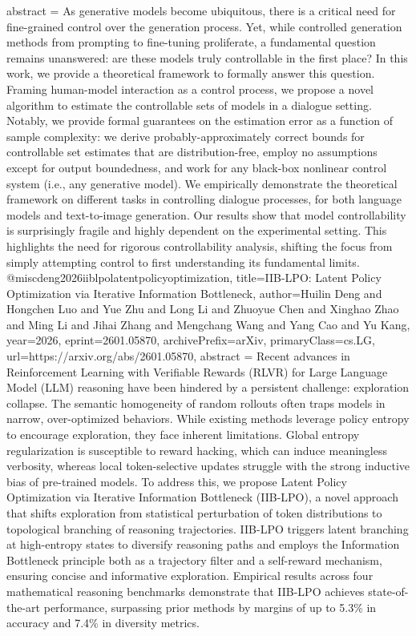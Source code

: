 {      abstract = {As generative models become ubiquitous, there is a critical need for fine-grained control over the generation process. Yet, while controlled generation methods from prompting to fine-tuning proliferate, a fundamental question remains unanswered: are these models truly controllable in the first place? In this work, we provide a theoretical framework to formally answer this question. Framing human-model interaction as a control process, we propose a novel algorithm to estimate the controllable sets of models in a dialogue setting. Notably, we provide formal guarantees on the estimation error as a function of sample complexity: we derive probably-approximately correct bounds for controllable set estimates that are distribution-free, employ no assumptions except for output boundedness, and work for any black-box nonlinear control system (i.e., any generative model). We empirically demonstrate the theoretical framework on different tasks in controlling dialogue processes, for both language models and text-to-image generation. Our results show that model controllability is surprisingly fragile and highly dependent on the experimental setting. This highlights the need for rigorous controllability analysis, shifting the focus from simply attempting control to first understanding its fundamental limits.}
}@misc{deng2026iiblpolatentpolicyoptimization,
      title={IIB-LPO: Latent Policy Optimization via Iterative Information Bottleneck}, 
      author={Huilin Deng and Hongchen Luo and Yue Zhu and Long Li and Zhuoyue Chen and Xinghao Zhao and Ming Li and Jihai Zhang and Mengchang Wang and Yang Cao and Yu Kang},
      year={2026},
      eprint={2601.05870},
      archivePrefix={arXiv},
      primaryClass={cs.LG},
      url={https://arxiv.org/abs/2601.05870},
      abstract = {Recent advances in Reinforcement Learning with Verifiable Rewards (RLVR) for Large Language Model (LLM) reasoning have been hindered by a persistent challenge: exploration collapse. The semantic homogeneity of random rollouts often traps models in narrow, over-optimized behaviors. While existing methods leverage policy entropy to encourage exploration, they face inherent limitations. Global entropy regularization is susceptible to reward hacking, which can induce meaningless verbosity, whereas local token-selective updates struggle with the strong inductive bias of pre-trained models. To address this, we propose Latent Policy Optimization via Iterative Information Bottleneck (IIB-LPO), a novel approach that shifts exploration from statistical perturbation of token distributions to topological branching of reasoning trajectories. IIB-LPO triggers latent branching at high-entropy states to diversify reasoning paths and employs the Information Bottleneck principle both as a trajectory filter and a self-reward mechanism, ensuring concise and informative exploration. Empirical results across four mathematical reasoning benchmarks demonstrate that IIB-LPO achieves state-of-the-art performance, surpassing prior methods by margins of up to 5.3\% in accuracy and 7.4\% in diversity metrics.}
}
